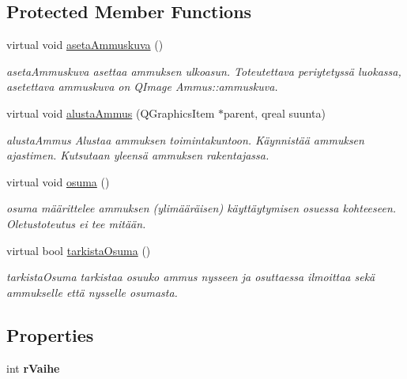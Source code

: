 \subsection*{Protected Member Functions}
\begin{DoxyCompactItemize}
\item 
virtual void \hyperlink{class_miina_ac7ad8b79597c7309a80e8eb25e7addc7}{aseta\-Ammuskuva} ()
\begin{DoxyCompactList}\small\item\em aseta\-Ammuskuva asettaa ammuksen ulkoasun. Toteutettava periytetyssä luokassa, asetettava ammuskuva on Q\-Image Ammus\-::ammuskuva. \end{DoxyCompactList}\item 
virtual void \hyperlink{class_miina_aebbb38a63fadaaba6304d017cf24773c}{alusta\-Ammus} (Q\-Graphics\-Item $\ast$parent, qreal suunta)
\begin{DoxyCompactList}\small\item\em alusta\-Ammus Alustaa ammuksen toimintakuntoon. Käynnistää ammuksen ajastimen. Kutsutaan yleensä ammuksen rakentajassa. \end{DoxyCompactList}\item 
virtual void \hyperlink{class_miina_a8de75749e159593e30bb2e4367d17698}{osuma} ()
\begin{DoxyCompactList}\small\item\em osuma määrittelee ammuksen (ylimääräisen) käyttäytymisen osuessa kohteeseen. Oletustoteutus ei tee mitään. \end{DoxyCompactList}\item 
virtual bool \hyperlink{class_miina_a10639c013e046a6670362ac4416d3c14}{tarkista\-Osuma} ()
\begin{DoxyCompactList}\small\item\em tarkista\-Osuma tarkistaa osuuko ammus nysseen ja osuttaessa ilmoittaa sekä ammukselle että nysselle osumasta. \end{DoxyCompactList}\end{DoxyCompactItemize}
\subsection*{Properties}
\begin{DoxyCompactItemize}
\item 
\hypertarget{class_miina_a10138792eda0d168cb35b8737eddec96}{int {\bfseries r\-Vaihe}}\label{class_miina_a10138792eda0d168cb35b8737eddec96}

\end{DoxyCompactItemize}

